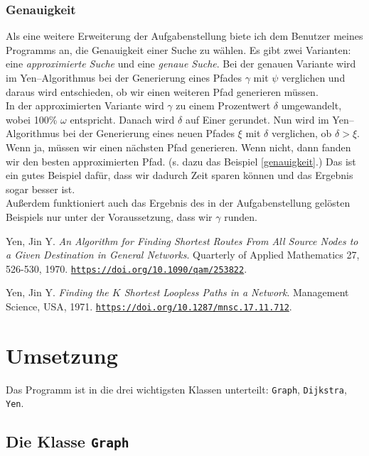 \documentclass[a4paper,10pt,ngerman]{scrartcl}
\begin{document}
\subsubsection{Genauigkeit}
Als eine weitere Erweiterung der Aufgabenstellung biete ich dem Benutzer meines Programms an,
die Genauigkeit einer Suche zu wählen. Es gibt zwei Varianten: eine \textit{approximierte Suche} und
eine \textit{genaue Suche}. Bei der genauen Variante wird im Yen--Algorithmus bei der Generierung eines Pfades
$\gamma$ mit $\psi$ verglichen und daraus wird entschieden, ob wir einen weiteren Pfad generieren müssen.\\
In der approximierten Variante wird $\gamma$ zu einem Prozentwert $\delta$ umgewandelt, wobei 100\% $\omega$ entspricht.
Danach wird $\delta$ auf Einer gerundet. 
Nun wird im Yen--Algorithmus bei der Generierung eines neuen Pfades $\xi$ mit $\delta$ verglichen,
ob $\delta > \xi$. Wenn ja, müssen wir einen nächsten Pfad generieren. Wenn nicht, dann fanden wir den besten approximierten Pfad.
(s. dazu das Beispiel \ref{genauigkeit}.) Das ist ein gutes Beispiel dafür, dass wir dadurch Zeit sparen können 
und das Ergebnis sogar besser ist.\\
Außerdem funktioniert auch das Ergebnis des in der Aufgabenstellung gelösten Beispiels nur unter der Voraussetzung,
dass wir $\gamma$ runden.

\begin{thebibliography}{2}
Yen, Jin Y. 
\textit{An Algorithm for Finding Shortest Routes From All Source Nodes to a Given Destination in General Networks}. 
Quarterly of Applied Mathematics 27, 526-530, 1970.
\href{https://doi.org/10.1090/qam/253822}{\texttt{https://doi.org/10.1090/qam/253822}}.

Yen, Jin Y.
\textit{Finding the $K$ Shortest Loopless Paths in a Network}.
Management Science, USA, 1971.
\href{https://doi.org/10.1287/mnsc.17.11.712}{\texttt{https://doi.org/10.1287/mnsc.17.11.712}}.

\end{thebibliography}

\newpage
\section{Umsetzung}
Das Programm ist in die drei wichtigsten Klassen unterteilt: \texttt{Graph}, \texttt{Dijkstra}, \texttt{Yen}.

\subsection{Die Klasse \texttt{Graph}}
\end{document}
